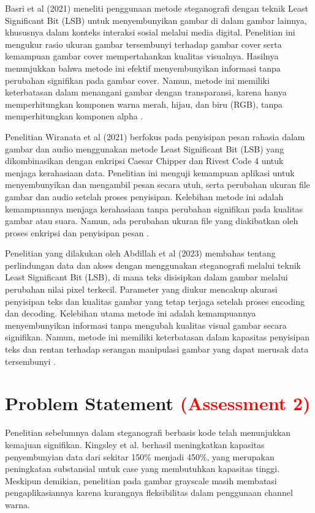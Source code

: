 \documentclass{ittelkom}
\begin{document}
Basri et al (2021) meneliti penggunaan metode steganografi dengan teknik Least
Significant Bit (LSB) untuk menyembunyikan gambar di dalam gambar lainnya,
khususnya dalam konteks interaksi sosial melalui media digital. Penelitian ini
mengukur rasio ukuran gambar tersembunyi terhadap gambar cover serta kemampuan
gambar cover mempertahankan kualitas visualnya. Hasilnya menunjukkan bahwa
metode ini efektif menyembunyikan informasi tanpa perubahan signifikan pada
gambar cover. Namun, metode ini memiliki keterbatasan dalam menangani gambar
dengan transparansi, karena hanya memperhitungkan komponen warna merah, hijau,
dan biru (RGB), tanpa memperhitungkan komponen alpha \cite{basri2021penerapan}.

Penelitian Wiranata et al (2021) berfokus pada penyisipan pesan rahasia dalam
gambar dan audio menggunakan metode Least Significant Bit (LSB) yang
dikombinasikan dengan enkripsi Caesar Chipper dan Rivest Code 4 untuk menjaga
kerahasiaan data. Penelitian ini menguji kemampuan aplikasi untuk
menyembunyikan dan mengambil pesan secara utuh, serta perubahan ukuran file
gambar dan audio setelah proses penyisipan. Kelebihan metode ini adalah
kemampuannya menjaga kerahasiaan tanpa perubahan signifikan pada kualitas
gambar atau suara. Namun, ada perubahan ukuran file yang diakibatkan oleh
proses enkripsi dan penyisipan pesan \cite{wiranata2021aplikasi}.


Penelitian yang dilakukan oleh Abdillah et al (2023) membahas tentang
perlindungan data dan akses dengan menggunakan steganografi melalui teknik
Least Significant Bit (LSB), di mana teks disisipkan dalam gambar melalui
perubahan nilai pixel terkecil. Parameter yang diukur mencakup akurasi
penyisipan teks dan kualitas gambar yang tetap terjaga setelah proses encoding
dan decoding. Kelebihan utama metode ini adalah kemampuannya menyembunyikan
informasi tanpa mengubah kualitas visual gambar secara signifikan. Namun,
metode ini memiliki keterbatasan dalam kapasitas penyisipan teks dan rentan
terhadap serangan manipulasi gambar yang dapat merusak data tersembunyi
\cite{abdillah2023implementasi}.

\section{Problem Statement \textcolor{red}{(Assessment 2)}} \label{request}

Penelitian sebelumnya dalam steganografi berbasis kode telah menunjukkan
kemajuan signifikan. Kingsley et al. \cite{kingsley2020improving} berhasil
meningkatkan kapasitas penyembunyian data dari sekitar 150\% menjadi 450\%,
yang merupakan peningkatan substansial untuk case yang membutuhkan kapasitas
tinggi. Meskipun demikian, penelitian pada gambar grayscale
\cite{soetarmono2012studi} masih membatasi pengaplikasiannya karena kurangnya
fleksibilitas dalam penggunaan channel warna.
\end{document}
